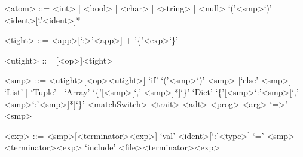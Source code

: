 \documentclass[11pt]{article} %
\begin{document}
\begin{grammar}

<atom> ::= <int> | <bool> | <char> | <string> | <null>
\alt `('<smp>`)'
\alt <ident>[`.'<ident>]*

<tight> ::= <app>[`:>'<app>]
\alt [`('<smp>`)']+
\alt '\{'<exp>`\}'

<utight> ::= [<op>]<tight>

<smp> ::= <utight>[<op><utight>]
\alt `if' `('<smp>`)' <smp> [`else' <smp>]
\alt `List' | `Tuple' | `Array' `\{'[<smp>[`,' <smp>]*]`\}'
\alt `Dict' `\{'[<smp>`:'<smp>[`,' <smp>`:'<smp>]*]`\}'
\alt <matchSwitch>
\alt <trait>
\alt <adt>
\alt <prog>
\alt <arg> `=>' <smp>

<exp> ::= <smp>[<terminator><exp>]
\alt `val' <ident>[`:'<type>] `=' <smp><terminator><exp>
\alt `include' <file><terminator><exp>

\end{grammar}
\end{document}
